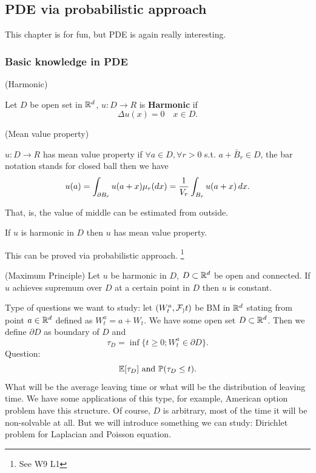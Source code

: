 \subsection{PDE via probabilistic approach}
This chapter is for fun, but PDE is again really interesting.
\subsubsection{Basic knowledge in PDE}
\begin{dfn}{(Harmonic)}

Let $D$ be open set in $\mathbb{R}^d$, $u: D\rightarrow R$ is \textbf{Harmonic} if 
\begin{equation*}
    \Delta u(x) = 0 \quad x\in D.
\end{equation*}
\end{dfn}

\begin{dfn}{(Mean value property)}

$u: D\rightarrow R$ has mean value property if $\forall a\in D, \forall r > 0$ s.t. $a + \bar{B}_r \in D$, the bar notation stands for closed ball then we have
\begin{equation*}
    u(a) = \int_{\partial B_r} u(a+x) \mu_r(\mathop{}\!d x) = \frac{1}{V_r} \int_{B_r} u(a+x) \mathop{}\!d x.
\end{equation*}
\end{dfn}
That, is, the value of middle can be estimated from outside.
\begin{thm}
If $u$ is harmonic in $D$ then $u$ has mean value property.
\end{thm} This can be proved via probabilistic approach. \footnote{See W9 L1}

\begin{cor}{(Maximum Principle)}
Let $u$ be harmonic in $D$, $D\subset \mathbb{R}^d$ be open and connected. If $u$ achieves supremum over $D$ at a certain point in $D$ then $u$ is constant.
\end{cor}
\vspace{2cm}
Type of questions we want to study: let $(W_t^a, \mathcal{F}_)t)$ be BM in $\mathbb{R}^d$ stating from point $a\in \mathbb{R}^d$ defined as $W_t^a = a + W_t$. We have some open set $D\subset \mathbb{R}^d$. Then we define $\partial D$ as boundary of $D$ and 
\begin{equation*}
    \tau_D = \inf\{t\geq 0; W_t^a \in \partial D\}.
\end{equation*}
Question:
\begin{equation*}
    \mathbb{E}[\tau_D] \text{ and } \mathbb{P}(\tau_D \leq t).
\end{equation*}
What will be the average leaving time or what will be the distribution of leaving time. We have some applications of this type, for example, American option problem have this structure. Of course, $D$ is arbitrary, most of the time it will be non-solvable at all. But we will introduce something we can study:  Dirichlet problem for Laplacian and Poisson equation.
\newpage
